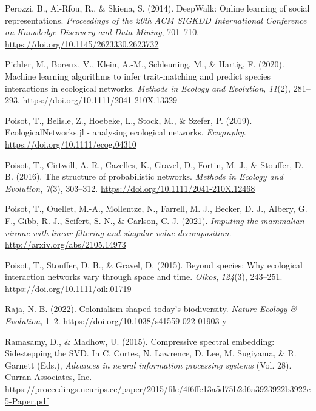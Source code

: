 \documentclass[10pt,oneside]{article}
\newlength{\cslhangindent}
\newenvironment{CSLReferences}[2] %
 {%
  \setlength{\parindent}{0pt}
  \ifodd #1 \everypar{\setlength{\hangindent}{\cslhangindent}}\ignorespaces\fi
  \ifnum #2 > 0
  \setlength{\parskip}{#2\baselineskip}
  \fi
 }%
 {}
\begin{document}
\begin{CSLReferences}{1}{0}
\leavevmode{}%
Perozzi, B., Al-Rfou, R., \& Skiena, S. (2014). DeepWalk: Online
learning of social representations. \emph{Proceedings of the 20th ACM
SIGKDD International Conference on Knowledge Discovery and Data Mining},
701--710. \url{https://doi.org/10.1145/2623330.2623732}

\leavevmode{}%
Pichler, M., Boreux, V., Klein, A.-M., Schleuning, M., \& Hartig, F.
(2020). Machine learning algorithms to infer trait-matching and predict
species interactions in ecological networks. \emph{Methods in Ecology
and Evolution}, \emph{11}(2), 281--293.
\url{https://doi.org/10.1111/2041-210X.13329}

\leavevmode{}%
Poisot, T., Belisle, Z., Hoebeke, L., Stock, M., \& Szefer, P. (2019).
EcologicalNetworks.jl - analysing ecological networks. \emph{Ecography}.
\url{https://doi.org/10.1111/ecog.04310}

\leavevmode{}%
Poisot, T., Cirtwill, A. R., Cazelles, K., Gravel, D., Fortin, M.-J., \&
Stouffer, D. B. (2016). The structure of probabilistic networks.
\emph{Methods in Ecology and Evolution}, \emph{7}(3), 303--312.
\url{https://doi.org/10.1111/2041-210X.12468}

\leavevmode{}%
Poisot, T., Ouellet, M.-A., Mollentze, N., Farrell, M. J., Becker, D.
J., Albery, G. F., Gibb, R. J., Seifert, S. N., \& Carlson, C. J.
(2021). \emph{Imputing the mammalian virome with linear filtering and
singular value decomposition}. \url{http://arxiv.org/abs/2105.14973}

\leavevmode{}%
Poisot, T., Stouffer, D. B., \& Gravel, D. (2015). Beyond species: Why
ecological interaction networks vary through space and time.
\emph{Oikos}, \emph{124}(3), 243--251.
\url{https://doi.org/10.1111/oik.01719}

\leavevmode{}%
Raja, N. B. (2022). Colonialism shaped today's biodiversity.
\emph{Nature Ecology \& Evolution}, 1--2.
\url{https://doi.org/10.1038/s41559-022-01903-y}

\leavevmode{}%
Ramasamy, D., \& Madhow, U. (2015). Compressive spectral embedding:
Sidestepping the SVD. In C. Cortes, N. Lawrence, D. Lee, M. Sugiyama, \&
R. Garnett (Eds.), \emph{Advances in neural information processing
systems} (Vol. 28). Curran Associates, Inc.
\url{https://proceedings.neurips.cc/paper/2015/file/4f6ffe13a5d75b2d6a3923922b3922e5-Paper.pdf}


\end{CSLReferences}
\end{document}
